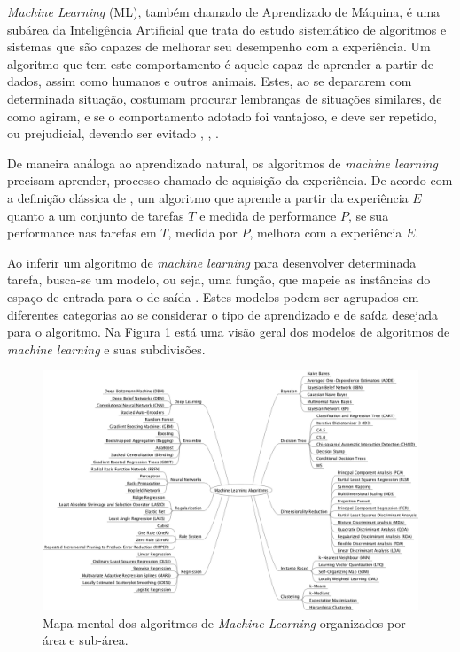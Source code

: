
\emph{Machine Learning} (ML), também chamado de Aprendizado de Máquina, é uma subárea da Inteligência Artificial que trata do estudo sistemático de algoritmos e sistemas que são capazes de melhorar seu desempenho com a experiência. Um algoritmo que tem este comportamento é aquele capaz de aprender a partir de dados, assim como humanos e outros animais. Estes, ao se depararem com determinada situação, costumam procurar lembranças de situações similares, de como agiram, e se o comportamento adotado foi vantajoso, e deve ser repetido, ou prejudicial, devendo ser evitado \cite{marsland2015machine}, \cite{goodfellow2016deep}, \cite{flach2012machine}.

De maneira análoga ao aprendizado natural, os algoritmos de \emph{machine learning} precisam aprender, processo chamado de aquisição da experiência. De acordo com a definição clássica de  \cite{mitchell1997machine}, um algoritmo que aprende a partir da experiência $E$ quanto a um conjunto de tarefas $T$ e medida de performance $P$, se sua performance nas tarefas em $T$, medida por $P$, melhora com a experiência $E$.

Ao inferir um algoritmo de \emph{machine learning} para desenvolver determinada tarefa, busca-se um modelo, ou seja, uma função, que mapeie as instâncias do espaço de entrada para o de saída \cite{flach2012machine}. Estes modelos podem ser agrupados em diferentes categorias ao se considerar o tipo de aprendizado e de saída desejada para o algoritmo. Na Figura \ref{fig:ml_algorithms} está uma visão geral dos modelos de algoritmos de \emph{machine learning} e suas subdivisões.

\begin{figure}
	\includegraphics[width=\linewidth]{img/machinelearningalgorithms.png}
	\caption{Mapa mental dos algoritmos de \emph{Machine Learning} organizados por área e sub-área.}
	\label{fig:ml_algorithms}
\end{figure}


